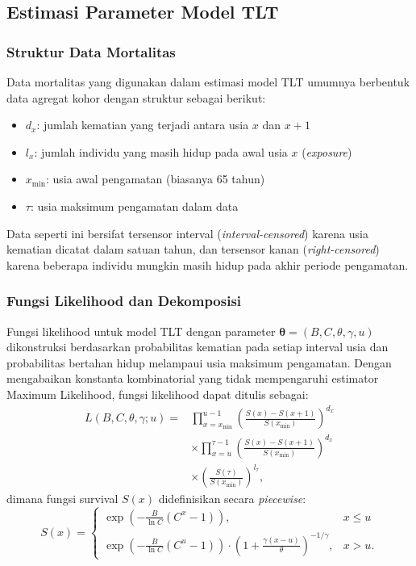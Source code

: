 \subsection{Estimasi Parameter Model TLT}

\subsubsection{Struktur Data Mortalitas}

Data mortalitas yang digunakan dalam estimasi model TLT umumnya berbentuk data agregat kohor dengan struktur sebagai berikut:
\begin{itemize}
    \item $d_x$: jumlah kematian yang terjadi antara usia $x$ dan $x+1$
    \item $l_x$: jumlah individu yang masih hidup pada awal usia $x$ (\textit{exposure})
    \item $x_{\text{min}}$: usia awal pengamatan (biasanya 65 tahun)
    \item $\tau$: usia maksimum pengamatan dalam data
\end{itemize}

Data seperti ini bersifat tersensor interval (\textit{interval-censored}) karena usia kematian dicatat dalam satuan tahun, dan tersensor kanan (\textit{right-censored}) karena beberapa individu mungkin masih hidup pada akhir periode pengamatan.

\subsubsection{Fungsi Likelihood dan Dekomposisi}

Fungsi likelihood untuk model TLT dengan parameter $\boldsymbol{\theta} = (B, C, \theta, \gamma, u)$ dikonstruksi berdasarkan probabilitas kematian pada setiap interval usia dan probabilitas bertahan hidup melampaui usia maksimum pengamatan. Dengan mengabaikan konstanta kombinatorial yang tidak mempengaruhi estimator Maximum Likelihood, fungsi likelihood dapat ditulis sebagai:
\begin{equation}
\begin{split}
L(B, C, \theta, \gamma; u) = &\prod_{x=x_{\text{min}}}^{u-1} \left(\frac{S(x) - S(x+1)}{S(x_{\text{min}})}\right)^{d_x} \\
&\times \prod_{x=u}^{\tau-1} \left(\frac{S(x) - S(x+1)}{S(x_{\text{min}})}\right)^{d_x} \\
&\times \left(\frac{S(\tau)}{S(x_{\text{min}})}\right)^{l_\tau},
\end{split}
\label{eq:tlt_likelihood_full}
\end{equation}
dimana fungsi survival $S(x)$ didefinisikan secara \textit{piecewise}:
\begin{equation}
S(x) =
\begin{cases}
\exp\left(-\frac{B}{\ln C}(C^x - 1)\right), & x \leq u \\[10pt]
\exp\left(-\frac{B}{\ln C}(C^u - 1)\right) \cdot \left(1 + \frac{\gamma(x-u)}{\theta}\right)^{-1/\gamma}, & x > u.
\end{cases}
\label{eq:tlt_survival_piecewise}
\end{equation}

